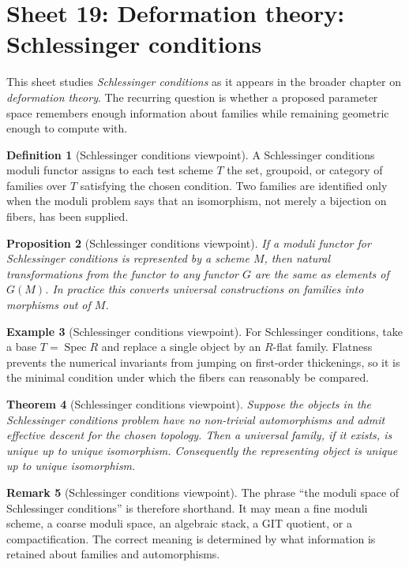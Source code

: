 \documentclass[11pt]{amsart}
\newtheorem{theorem}{Theorem}[section]
\newtheorem{proposition}[theorem]{Proposition}
\theoremstyle{definition}
\newtheorem{definition}[theorem]{Definition}
\newtheorem{example}[theorem]{Example}
\newtheorem{remark}[theorem]{Remark}
\newcommand{\Spec}{\operatorname{Spec}}
\begin{document}
\section{Sheet 19: Deformation theory: Schlessinger conditions}
This sheet studies \emph{Schlessinger conditions} as it appears in the broader chapter on \emph{deformation theory}.  The recurring question is whether a proposed parameter space remembers enough information about families while remaining geometric enough to compute with.
\begin{definition}[Schlessinger conditions viewpoint]
A Schlessinger conditions moduli functor assigns to each test scheme $T$ the set, groupoid, or category of families over $T$ satisfying the chosen condition.  Two families are identified only when the moduli problem says that an isomorphism, not merely a bijection on fibers, has been supplied.
\end{definition}
\begin{proposition}[Schlessinger conditions viewpoint]
If a moduli functor for Schlessinger conditions is represented by a scheme $M$, then natural transformations from the functor to any functor $G$ are the same as elements of $G(M)$.  In practice this converts universal constructions on families into morphisms out of $M$.
\end{proposition}
\begin{example}[Schlessinger conditions viewpoint]
For Schlessinger conditions, take a base $T=\Spec R$ and replace a single object by an $R$-flat family.  Flatness prevents the numerical invariants from jumping on first-order thickenings, so it is the minimal condition under which the fibers can reasonably be compared.
\end{example}
\begin{theorem}[Schlessinger conditions viewpoint]
Suppose the objects in the Schlessinger conditions problem have no non-trivial automorphisms and admit effective descent for the chosen topology.  Then a universal family, if it exists, is unique up to unique isomorphism.  Consequently the representing object is unique up to unique isomorphism.
\end{theorem}
\begin{remark}[Schlessinger conditions viewpoint]
The phrase ``the moduli space of Schlessinger conditions'' is therefore shorthand.  It may mean a fine moduli scheme, a coarse moduli space, an algebraic stack, a GIT quotient, or a compactification.  The correct meaning is determined by what information is retained about families and automorphisms.
\end{remark}
\end{document}
